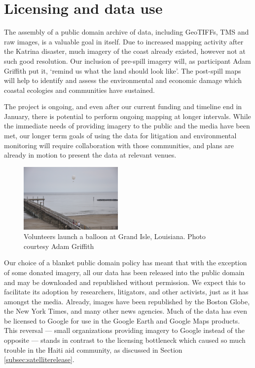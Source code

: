 \documentclass[11pt,oneside,notitlepage]{report}
\begin{document}
\section{Licensing and data use}

The assembly of a public domain archive of data, including \ac{GeoTIFF}s, \ac{TMS} and raw images, is a valuable goal in itself. Due to increased mapping activity after the Katrina disaster, much imagery of the coast already existed, however not at such good resolution. Our inclusion of pre-spill imagery will, as participant Adam Griffith put it, `remind us what the land should look like'. \cite{griffith2010isle} The post-spill maps will help to identify and assess the environmental and economic damage which coastal ecologies and communities have sustained.  
 
The project is ongoing, and even after our current funding and timeline end in January, there is potential to perform ongoing mapping at longer intervals. While the immediate needs of providing imagery to the public and the media have been met, our longer term goals of using the data for litigation and environmental monitoring will require collaboration with those communities, and plans are already in motion to present the data at relevant venues. 

\begin{figure}
	\begin{flushright}
		\includegraphics[width=0.45\textwidth]{images/labb-adam-balloon.jpg}
		\caption{Volunteers launch a balloon at Grand Isle, Louisiana. Photo courtesy Adam Griffith}
	\end{flushright}
\end{figure}

Our choice of a blanket public domain policy has meant that with the exception of some donated imagery, all our data has been released into the public domain and may be downloaded and republished without permission. We expect this to facilitate its adoption by researchers, litigators, and other activists, just as it has amongst the media. Already, images have been republished by the Boston Globe, the New York Times, and many other news agencies. Much of the data has even be licensed to Google for use in the Google Earth and Google Maps products. This reversal --- small organizations providing imagery to Google instead of the opposite --- stands in contrast to the licensing bottleneck which caused so much trouble in the Haiti aid community, as discussed in Section \ref{subsec:satelliterelease}. 
\end{document}
